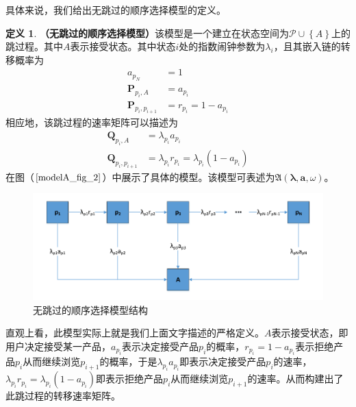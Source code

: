 \documentclass[UTF8]{ctexart}
\theoremstyle{plain}
\theoremstyle{definition}
\newtheorem{defn}{定义}[section]
\theoremstyle{remark}
\begin{document}
	具体来说，我们给出无跳过的顺序选择模型的定义。
	\begin{defn}\textbf{（无跳过的顺序选择模型）}该模型是一个建立在状态空间为$\mathcal{P} \cup \left\{A\right\}$上的跳过程。其中$A$表示接受状态。其中状态$i$处的指数闹钟参数为$\lambda_i$，且其嵌入链的转移概率为
	\begin{equation}
	\begin{aligned}
	a_{p_N} & = 1 \\
	\bm{P}_{p_i,A}  & = a_{p_i}  \\
	\bm{P}_{p_i,p_{i+1}} & = r_{p_i} = 1 - a_{p_i}
	\end{aligned}
	\end{equation}
	相应地，该跳过程的速率矩阵可以描述为
	\begin{equation}
	\begin{aligned}
	\bm{Q}_{p_i,A} & = \lambda_{p_i} a_{p_i} \\
	\bm{Q}_{p_i,p_{i+1}} & = \lambda_{p_i} r_{p_i} = \lambda_{p_i} ( 1 - a_{p_i})
	\end{aligned}
	\end{equation}
	在图（$\ref{modelA_fig_2}$）中展示了具体的模型。该模型可表述为$\mathfrak{A}\left(\bm{\lambda}, \bm{a}, \omega\right)$。
	\end{defn}
	\begin{figure}[h!] 
		\centering
		\includegraphics[width = 12cm]{modelA_fig_2.pdf}
		\caption{无跳过的顺序选择模型结构}\label{modelA_fig_2}
	\end{figure}
	直观上看，此模型实际上就是我们上面文字描述的严格定义。$A$表示接受状态，即用户决定接受某一产品，$a_{p_i}$表示决定接受产品$p_i$的概率，$r_{p_i} = 1 - a_{p_i}$表示拒绝产品$p_i$从而继续浏览$p_{i+1}$的概率，于是$\lambda_{p_i} a_{p_i}$即表示决定接受产品$p_i$的速率，$\lambda_{p_i} r_{p_i} = \lambda_{p_i} (1 - a_{p_i})$即表示拒绝产品$p_i$从而继续浏览$p_{i+1}$的速率。从而构建出了此跳过程的转移速率矩阵。
\end{document}
